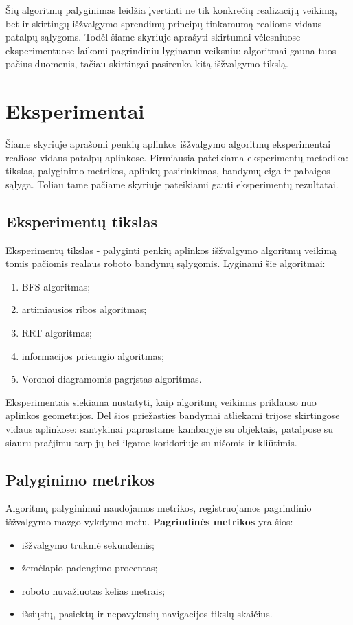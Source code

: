 \documentclass[]{VUMIFTemplateClass}
\begin{document}
Šių algoritmų palyginimas leidžia įvertinti ne tik konkrečių realizacijų veikimą, bet ir skirtingų išžvalgymo sprendimų principų tinkamumą realioms vidaus
patalpų sąlygoms. Todėl šiame skyriuje aprašyti skirtumai vėlesniuose eksperimentuose laikomi pagrindiniu lyginamu veiksniu: algoritmai gauna tuos pačius duomenis, tačiau skirtingai pasirenka kitą išžvalgymo tikslą.

\section[EKSPERIMENTAI]{Eksperimentai}

Šiame skyriuje aprašomi penkių aplinkos išžvalgymo algoritmų eksperimentai realiose vidaus patalpų aplinkose. Pirmiausia pateikiama eksperimentų metodika:
tikslas, palyginimo metrikos, aplinkų pasirinkimas, bandymų eiga ir pabaigos sąlyga. Toliau tame pačiame skyriuje pateikiami gauti eksperimentų rezultatai.

\subsection{Eksperimentų tikslas}

Eksperimentų tikslas - palyginti penkių aplinkos išžvalgymo algoritmų veikimą tomis pačiomis realaus roboto bandymų sąlygomis. Lyginami šie algoritmai:
\begin{enumerate}
  \item BFS algoritmas;
  \item artimiausios ribos algoritmas;
  \item RRT algoritmas;
  \item informacijos prieaugio algoritmas;
  \item Voronoi diagramomis pagrįstas algoritmas.
\end{enumerate}

Eksperimentais siekiama nustatyti, kaip algoritmų veikimas priklauso nuo aplinkos geometrijos. Dėl šios priežasties bandymai atliekami trijose skirtingose
vidaus aplinkose: santykinai paprastame kambaryje su objektais, patalpose su siauru praėjimu tarp jų bei ilgame koridoriuje su nišomis ir
kliūtimis.

\subsection{Palyginimo metrikos}

Algoritmų palyginimui naudojamos metrikos, registruojamos pagrindinio išžvalgymo mazgo vykdymo metu. \textbf{Pagrindinės metrikos} yra šios:
\begin{itemize}
  \item išžvalgymo trukmė sekundėmis;
  \item žemėlapio padengimo procentas;
  \item roboto nuvažiuotas kelias metrais;
  \item išsiųstų, pasiektų ir nepavykusių navigacijos tikslų skaičius.
\end{itemize}
\end{document}
